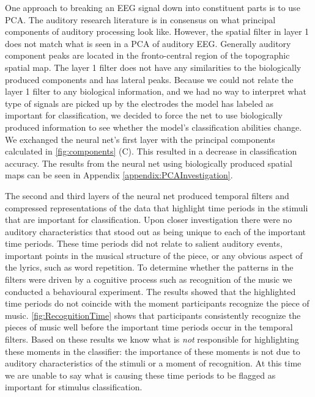 One approach to breaking an EEG signal down into constituent parts is to use \ac{PCA}.
The auditory research literature is in consensus on what principal components of auditory processing look like.
However, the spatial filter in layer 1 does not match what is seen in a \ac{PCA} of auditory \ac{EEG}.
Generally auditory component peaks are located in the fronto-central region of the topographic spatial map. 
The layer 1 filter does not have any similarities to the biologically produced components and has lateral peaks. 
Because we could not relate the layer 1 filter to any biological information, and we had no way to interpret what type of signals are picked up by the electrodes the model has labeled as important for classification, we decided to force the net to use biologically produced information to see whether the model's classification abilities change. 
We exchanged the neural net's first layer with the principal components calculated in \autoref{fig:components} (C). 
This resulted in a decrease in classification accuracy. The results from the neural net using biologically produced spatial maps can be seen in Appendix \ref{appendix:PCAInvestigation}.

The second and third layers of the neural net produced temporal filters and compressed representations of the data that highlight time periods in the stimuli that are important for classification. 
Upon closer investigation there were no auditory characteristics that stood out as being unique to each of the important time periods.
These time periods did not relate to salient auditory events, important points in the musical structure of the piece, or any obvious aspect of the lyrics, such as word repetition. 
To determine whether the patterns in the filters were driven by a cognitive process such as recognition of the music we conducted a behavioural experiment.
The results showed that the highlighted time periods do not coincide with the moment participants recognize the piece of music. 
\autoref{fig:RecognitionTime} shows that participants consistently recognize the pieces of music well before the important time periods occur in the temporal filters. 
Based on these results we know what is \emph{not} responsible for highlighting these moments in the classifier: the importance of these moments is not due to auditory characteristics of the stimuli or a moment of recognition.
At this time we are unable to say what is causing these time periods to be flagged as important for stimulus classification. 

